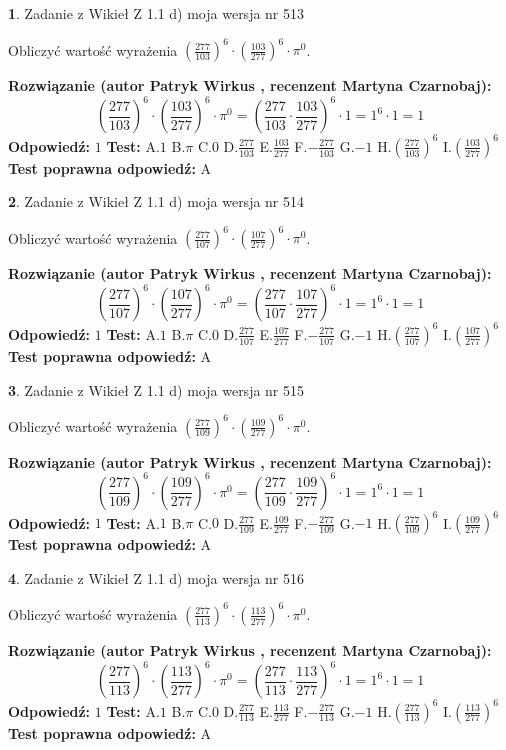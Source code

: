 \documentclass[12pt, a4paper]{article}
\theoremstyle{definition} %
\newtheorem{zad}{}
\newcommand{\zadStart}[1]{\begin{zad}#1\newline}
\newcommand{\zadStop}{\end{zad}}
\newcommand{\rozwStart}[2]{\noindent \textbf{Rozwiązanie (autor #1 , recenzent #2): }\newline}
\newcommand{\rozwStop}{\newline}
\newcommand{\odpStart}{\noindent \textbf{Odpowiedź:}\newline}
\newcommand{\odpStop}{\newline}
\newcommand{\testStart}{\noindent \textbf{Test:}\newline}
\newcommand{\testStop}{\newline}
\newcommand{\kluczStart}{\noindent \textbf{Test poprawna odpowiedź:}\newline}
\newcommand{\kluczStop}{\newline}
\begin{document}
\zadStart{Zadanie z Wikieł Z 1.1 d) moja wersja nr 513}

Obliczyć wartość wyrażenia $(\frac{277}{103})^{6} \cdot (\frac{103}{277})^{6} \cdot \pi^{0}$.
\zadStop
\rozwStart{Patryk Wirkus}{Martyna Czarnobaj}
$$(\frac{277}{103})^{6} \cdot (\frac{103}{277})^{6} \cdot \pi^{0} = (\frac{277}{103} \cdot \frac{103}{277})^{6} \cdot 1 = 1^{6} \cdot 1 = 1$$
\rozwStop
\odpStart
$1$
\odpStop
\testStart
A.$1$ B.$\pi$ C.$0$ D.$\frac{277}{103}$ E.$\frac{103}{277}$
F.$-\frac{277}{103}$ G.$-1$
H.$(\frac{277}{103})^{6}$
I.$(\frac{103}{277})^{6}$
\testStop
\kluczStart
A
\kluczStop



\zadStart{Zadanie z Wikieł Z 1.1 d) moja wersja nr 514}

Obliczyć wartość wyrażenia $(\frac{277}{107})^{6} \cdot (\frac{107}{277})^{6} \cdot \pi^{0}$.
\zadStop
\rozwStart{Patryk Wirkus}{Martyna Czarnobaj}
$$(\frac{277}{107})^{6} \cdot (\frac{107}{277})^{6} \cdot \pi^{0} = (\frac{277}{107} \cdot \frac{107}{277})^{6} \cdot 1 = 1^{6} \cdot 1 = 1$$
\rozwStop
\odpStart
$1$
\odpStop
\testStart
A.$1$ B.$\pi$ C.$0$ D.$\frac{277}{107}$ E.$\frac{107}{277}$
F.$-\frac{277}{107}$ G.$-1$
H.$(\frac{277}{107})^{6}$
I.$(\frac{107}{277})^{6}$
\testStop
\kluczStart
A
\kluczStop



\zadStart{Zadanie z Wikieł Z 1.1 d) moja wersja nr 515}

Obliczyć wartość wyrażenia $(\frac{277}{109})^{6} \cdot (\frac{109}{277})^{6} \cdot \pi^{0}$.
\zadStop
\rozwStart{Patryk Wirkus}{Martyna Czarnobaj}
$$(\frac{277}{109})^{6} \cdot (\frac{109}{277})^{6} \cdot \pi^{0} = (\frac{277}{109} \cdot \frac{109}{277})^{6} \cdot 1 = 1^{6} \cdot 1 = 1$$
\rozwStop
\odpStart
$1$
\odpStop
\testStart
A.$1$ B.$\pi$ C.$0$ D.$\frac{277}{109}$ E.$\frac{109}{277}$
F.$-\frac{277}{109}$ G.$-1$
H.$(\frac{277}{109})^{6}$
I.$(\frac{109}{277})^{6}$
\testStop
\kluczStart
A
\kluczStop



\zadStart{Zadanie z Wikieł Z 1.1 d) moja wersja nr 516}

Obliczyć wartość wyrażenia $(\frac{277}{113})^{6} \cdot (\frac{113}{277})^{6} \cdot \pi^{0}$.
\zadStop
\rozwStart{Patryk Wirkus}{Martyna Czarnobaj}
$$(\frac{277}{113})^{6} \cdot (\frac{113}{277})^{6} \cdot \pi^{0} = (\frac{277}{113} \cdot \frac{113}{277})^{6} \cdot 1 = 1^{6} \cdot 1 = 1$$
\rozwStop
\odpStart
$1$
\odpStop
\testStart
A.$1$ B.$\pi$ C.$0$ D.$\frac{277}{113}$ E.$\frac{113}{277}$
F.$-\frac{277}{113}$ G.$-1$
H.$(\frac{277}{113})^{6}$
I.$(\frac{113}{277})^{6}$
\testStop
\kluczStart
A
\kluczStop
\end{document}
